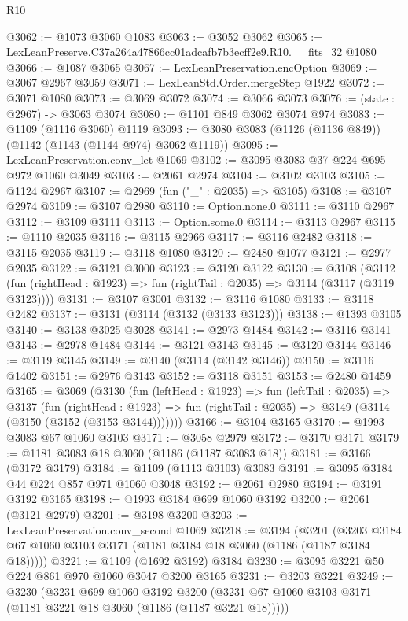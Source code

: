 \begin{lexlean}{R10}
\begin{coremodule}
@3062 := @1073 @3060 @1083
@3063 := @3052 @3062
@3065 := LexLeanPreserve.C37a264a47866cc01adcafb7b3ecff2e9.R10.__fits_32 @1080
@3066 := @1087 @3065
@3067 := LexLeanPreservation.encOption
@3069 := @3067 @2967 @3059
@3071 := LexLeanStd.Order.mergeStep @1922
@3072 := @3071 @1080
@3073 := @3069 @3072
@3074 := @3066 @3073
@3076 := (state : @2967) -> @3063 @3074
@3080 := @1101 @849 @3062 @3074 @974
@3083 := @1109 (@1116 @3060) @1119
@3093 := @3080 @3083 (@1126 (@1136 @849)) (@1142 (@1143 (@1144 @974) @3062 @1119))
@3095 := LexLeanPreservation.conv_let @1069
@3102 := @3095 @3083 @37 @224 @695 @972 @1060 @3049
@3103 := @2061 @2974
@3104 := @3102 @3103
@3105 := @1124 @2967
@3107 := @2969 (fun ("_" : @2035) => @3105)
@3108 := @3107 @2974
@3109 := @3107 @2980
@3110 := Option.none.{0}
@3111 := @3110 @2967
@3112 := @3109 @3111
@3113 := Option.some.{0}
@3114 := @3113 @2967
@3115 := @1110 @2035
@3116 := @3115 @2966
@3117 := @3116 @2482
@3118 := @3115 @2035
@3119 := @3118 @1080
@3120 := @2480 @1077
@3121 := @2977 @2035
@3122 := @3121 @3000
@3123 := @3120 @3122
@3130 := @3108
    (@3112 (fun (rightHead : @1923) => fun (rightTail : @2035) => @3114 (@3117 (@3119 @3123))))
@3131 := @3107 @3001
@3132 := @3116 @1080
@3133 := @3118 @2482
@3137 := @3131 (@3114 (@3132 (@3133 @3123)))
@3138 := @1393 @3105
@3140 := @3138 @3025 @3028
@3141 := @2973 @1484
@3142 := @3116 @3141
@3143 := @2978 @1484
@3144 := @3121 @3143
@3145 := @3120 @3144
@3146 := @3119 @3145
@3149 := @3140 (@3114 (@3142 @3146))
@3150 := @3116 @1402
@3151 := @2976 @3143
@3152 := @3118 @3151
@3153 := @2480 @1459
@3165 := @3069
    (@3130
      (fun (leftHead : @1923) =>
      fun (leftTail : @2035) =>
      @3137
        (fun (rightHead : @1923) =>
        fun (rightTail : @2035) => @3149 (@3114 (@3150 (@3152 (@3153 @3144)))))))
@3166 := @3104 @3165
@3170 := @1993 @3083 @67 @1060 @3103
@3171 := @3058 @2979
@3172 := @3170 @3171
@3179 := @1181 @3083 @18 @3060 (@1186 (@1187 @3083 @18))
@3181 := @3166 (@3172 @3179)
@3184 := @1109 (@1113 @3103) @3083
@3191 := @3095 @3184 @44 @224 @857 @971 @1060 @3048
@3192 := @2061 @2980
@3194 := @3191 @3192 @3165
@3198 := @1993 @3184 @699 @1060 @3192
@3200 := @2061 (@3121 @2979)
@3201 := @3198 @3200
@3203 := LexLeanPreservation.conv_second @1069
@3218 := @3194
    (@3201 (@3203 @3184 @67 @1060 @3103 @3171 (@1181 @3184 @18 @3060 (@1186 (@1187 @3184 @18)))))
@3221 := @1109 (@1692 @3192) @3184
@3230 := @3095 @3221 @50 @224 @861 @970 @1060 @3047 @3200 @3165
@3231 := @3203 @3221
@3249 := @3230
    (@3231
      @699
      @1060
      @3192
      @3200
      (@3231 @67 @1060 @3103 @3171 (@1181 @3221 @18 @3060 (@1186 (@1187 @3221 @18)))))

\end{coremodule}
\end{lexlean}
